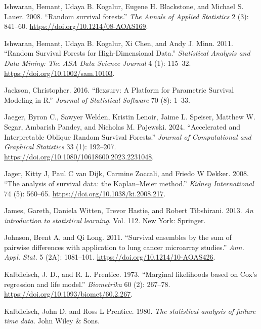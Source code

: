 \documentclass[
  letterpaper,
  krantz2]{style/krantz}
\newlength{\cslhangindent}
\newenvironment{CSLReferences}[2] %
 {\begin{list}{}{%
  \setlength{\itemindent}{0pt}
  \setlength{\leftmargin}{0pt}
  \setlength{\parsep}{0pt}
  \ifodd #1
   \setlength{\leftmargin}{\cslhangindent}
   \setlength{\itemindent}{-1\cslhangindent}
  \fi
  \setlength{\itemsep}{#2\baselineskip}}}
 {\end{list}}
\begin{document}
\begin{CSLReferences}{1}{0}
Ishwaran, Hemant, Udaya B. Kogalur, Eugene H. Blackstone, and Michael S.
Lauer. 2008. {``{Random survival forests}.''} \emph{The Annals of
Applied Statistics} 2 (3): 841--60.
\url{https://doi.org/10.1214/08-AOAS169}.

Ishwaran, Hemant, Udaya B. Kogalur, Xi Chen, and Andy J. Minn. 2011.
{``Random Survival Forests for High-Dimensional Data.''}
\emph{Statistical Analysis and Data Mining: The ASA Data Science
Journal} 4 (1): 115--32. \url{https://doi.org/10.1002/sam.10103}.

Jackson, Christopher. 2016. {``{flexsurv: A Platform for Parametric
Survival Modeling in R}.''} \emph{Journal of Statistical Software} 70
(8): 1--33.

Jaeger, Byron C., Sawyer Welden, Kristin Lenoir, Jaime L. Speiser,
Matthew W. Segar, Ambarish Pandey, and Nicholas M. Pajewski. 2024.
{``Accelerated and Interpretable Oblique Random Survival Forests.''}
\emph{Journal of Computational and Graphical Statistics} 33 (1):
192--207. \url{https://doi.org/10.1080/10618600.2023.2231048}.

Jager, Kitty J, Paul C van Dijk, Carmine Zoccali, and Friedo W Dekker.
2008. {``{The analysis of survival data: the Kaplan--Meier method}.''}
\emph{Kidney International} 74 (5): 560--65.
\url{https://doi.org/10.1038/ki.2008.217}.

James, Gareth, Daniela Witten, Trevor Hastie, and Robert Tibshirani.
2013. \emph{{An introduction to statistical learning}}. Vol. 112. New
York: Springer.

Johnson, Brent A, and Qi Long. 2011. {``{Survival ensembles by the sum
of pairwise differences with application to lung cancer microarray
studies}.''} \emph{Ann. Appl. Stat.} 5 (2A): 1081--101.
\url{https://doi.org/10.1214/10-AOAS426}.

Kalbfleisch, J. D., and R. L. Prentice. 1973. {``{Marginal likelihoods
based on Cox's regression and life model}.''} \emph{Biometrika} 60 (2):
267--78. \url{https://doi.org/10.1093/biomet/60.2.267}.

Kalbfleisch, John D, and Ross L Prentice. 1980. \emph{{The statistical
analysis of failure time data}}. John Wiley \& Sons.


\end{CSLReferences}
\end{document}
